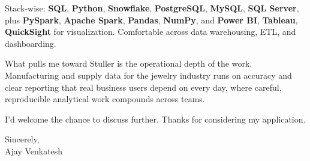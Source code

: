 \documentclass[letterpaper,11pt]{article}
\begin{document}
Stack-wise: \textbf{SQL}, \textbf{Python}, \textbf{Snowflake}, \textbf{PostgreSQL}, \textbf{MySQL}, \textbf{SQL Server}, plus \textbf{PySpark}, \textbf{Apache Spark}, \textbf{Pandas}, \textbf{NumPy}, and \textbf{Power BI}, \textbf{Tableau}, \textbf{QuickSight} for visualization. Comfortable across data warehousing, ETL, and dashboarding.

What pulls me toward Stuller is the operational depth of the work. Manufacturing and supply data for the jewelry industry runs on accuracy and clear reporting that real business users depend on every day, where careful, reproducible analytical work compounds across teams.

I'd welcome the chance to discuss further. Thanks for considering my application.

\vspace{12pt}
Sincerely, \\
Ajay Venkatesh
\end{document}
